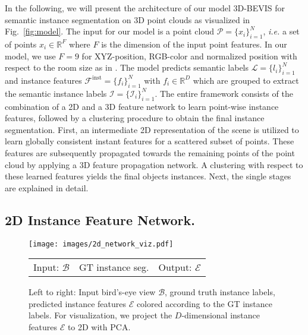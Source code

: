 \documentclass[runningheads]{llncs}
\newcommand{\reffig}[1]{Fig.~\ref{fig:#1}}
\newcommand{\ie}{\textit{i.e. }}
\begin{document}
In  the following, we will present the architecture of our model 3D-BEVIS for semantic instance segmentation on 3D point clouds as visualized in \reffig{model}.
The input for our model is a point cloud $\mathcal{P} = \{x_i\}_{i=1}^N$, \ie a set of points $x_i \in \mathbb{R}^{F}$ where $F$ is the dimension of the input point features. In our model, we use $F = 9$ for XYZ-position, RGB-color and normalized position with respect to the room size as in \cite{Qi17CVPR}.
The model predicts semantic labels $\mathcal{L}=\{l_i\}_{i=1}^N$ and instance features $\mathcal{F}^{\text{inst}}=\{f_i\}_{i=1}^N$ with $f_i \in \mathbb{R}^{D}$
which are grouped to extract the semantic instance labels
$\mathcal{I} = \{\mathcal{I}_i\}_{i=1}^N$.
The entire framework consists of the combination of a 2D and a 3D feature network to learn point-wise instance features, followed by a clustering procedure to obtain the final instance segmentation.
First, an intermediate 2D representation of the scene is utilized to learn globally consistent instant features for a scattered subset of points. These features are subsequently propagated towards the remaining points of the point cloud by applying a 3D feature propagation network. A clustering with respect to these learned features yields the final objects instances.
Next, the single stages are explained in detail.

\subsection{2D Instance Feature Network.}
\begin{figure}[t]
	\begin{center}
	\texttt{[image: images/2d\_network\_viz.pdf]}
	\end{center}
	\vspace{-4mm}
	\begin{small}
	\begin{tabular}{ccc}
		\hspace{30mm} Input: $\mathcal{B}$ &
		\hspace{4mm} GT instance seg.  &
		\hspace{4mm} Output: $\mathcal{E}$ \\
	\end{tabular}
	\end{small}
	\vspace{1mm}
	\caption{Left to right: Input bird's-eye view $\mathcal{B}$, ground truth instance labels, predicted instance features $\mathcal{E}$ colored according to the GT instance labels. For visualization, we project the $D$-dimensional instance features $\mathcal{E}$ to 2D with PCA.}
	\label{fig:2d_network_viz}
\end{figure}
\end{document}
